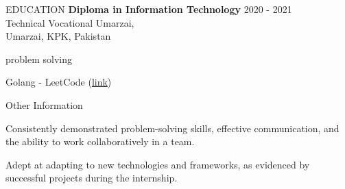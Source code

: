 \documentclass{resume}
\begin{document}
\begin{rSection}{EDUCATION}
  {\bf Diploma in Information Technology} \hfill {2020 - 2021}
  \\
    Technical Vocational Umarzai, 
    \\
    Umarzai, KPK, Pakistan
  \\
\end{rSection}

\begin{rSection}{problem solving}
        \item Golang -  LeetCode (\href{https://leetcode.com/csaqibshah/}{link})
\end{rSection}

\begin{rSection}{Other Information}
        \item Consistently demonstrated problem-solving skills, effective communication, and the ability to work collaboratively in a team.
        \item Adept at adapting to new technologies and frameworks, as evidenced by successful projects during the internship.
\end{rSection}
\end{document}
